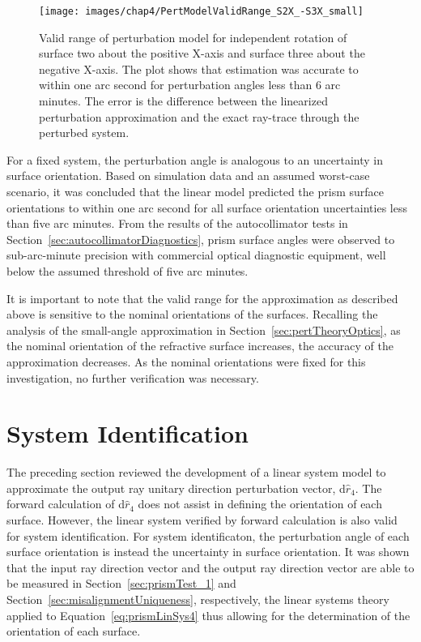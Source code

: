\begin{figure}[htb]		%
\centering
\texttt{[image: images/chap4/PertModelValidRange\_S2X\_-S3X\_small]}
\caption{Valid range of perturbation model for independent rotation of surface two about the positive X-axis and surface three about the negative X-axis. The plot shows that estimation was accurate to within one arc second for perturbation angles less than 6 arc minutes. The error is the difference between the linearized perturbation approximation and the exact ray-trace through the perturbed system.}
\label{fig:PertModelValidRange_S2X_-S3X_small}
\end{figure}

For a fixed system, the perturbation angle is analogous to an uncertainty in surface orientation. Based on simulation data and an assumed worst-case scenario, it was concluded that the linear model predicted the prism surface orientations to within one arc second for all surface orientation uncertainties less than five arc minutes. From the results of the autocollimator tests in Section~\ref{sec:autocollimatorDiagnostics}, prism surface angles were observed to sub-arc-minute precision with commercial optical diagnostic equipment, well below the assumed threshold of five arc minutes.

It is important to note that the valid range for the approximation as described above is sensitive to the nominal orientations of the surfaces. Recalling the analysis of the small-angle approximation in Section~\ref{sec:pertTheoryOptics}, as the nominal orientation of the refractive surface increases, the accuracy of the approximation decreases. As the nominal orientations were fixed for this investigation, no further verification was necessary.

\section{System Identification}
\label{sec:systemID}

The preceding section reviewed the development of a linear system model to approximate the output ray unitary direction perturbation vector, d$\hat{r}_4$. The forward calculation of d$\hat{r}_4$  does not assist in defining the orientation of each surface. However, the linear system verified by forward calculation is also valid for system identification. For system identificaton, the perturbation angle of each surface orientation is instead the uncertainty in surface orientation. It was shown that the input ray direction vector and the output ray direction vector are able to be measured in Section~\ref{sec:prismTest_1} and Section~\ref{sec:misalignmentUniqueness}, respectively, the linear systems theory applied to Equation~\eqref{eq:prismLinSys4} thus allowing for the determination of the orientation of each surface.

